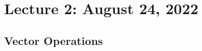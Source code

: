     \begin{comment}
    \vphantom
    \\
    \\
    The famous Cauchy-Schwarz Inequality is stated below.
    \begin{theorem}{\Stop\,\,The Cauchy-Schwarz Inequality}{cauchyschwarz}

        Let \(\vec{v},\vec{w}\in\mathbb{R}^n\). Then,
        \begin{equation*}
            \vec{v}\cdot\vec{w}\leq||\vec{v}||||\vec{w}||.
        \end{equation*}
        \begin{proof}
            We may rewrite the equation as
            \begin{align*}
                \sum_{k=1}^n v_kw_k&\leq\sqrt{\left(\sum_{k=1}^nv_k^2\right)\left(\sum_{k=1}^nw_k^2\right)} \\
                &\leq\sqrt{(v_1^2+v_2^2\cdots+v_n^2)(w_1^2+w_2^2+\cdots+w_n^2)} \\
                &\leq\sqrt{v_1^2w_1^2+v_1^2w_2^2+v_2^2w_1^2+v_2^2w_2^2+\cdots+v_1^2w_n^2+v_2^2w_n^2+v_n^2w_1^2+v_n^2w_2^2+v_n^2w_n^2}
            \end{align*}
            The terms \(v_1^2w_1^2, v_2^2w_2^2,\ldots,v_n^2w_n^2\) are all present on the left hand side, but do not make up all the addends on the right hand side.
        \end{proof}
        
    \end{theorem}
    \end{comment}

\pagebreak

\section{Lecture 2: August 24, 2022}

    \subsection{Vector Operations}

